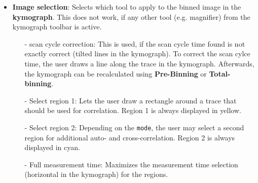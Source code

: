 \begin{itemize}
\item  \textbf{Image selection}: Selects which tool to apply to the binned image in the \textbf{kymograph}. This does not work, if any other tool (e.g. magnifier) from the kymograph toolbar is active.
	\begin{itemize}
	\item[-] scan cycle correction: This is used, if the scan cycle time found is not exactly correct (tilted lines in the kymograph). To correct the scan cylce time, the user draws a line along the trace in the kymograph. Afterwards, the kymograph can be recalculated using \textbf{Pre-Binning} or \textbf{Total-binning}.
	\item[-] Select region 1: Lets the user draw a rectangle around a trace that should be used for correlation. Region 1 is always displayed in yellow.
	\item[-] Select region 2: Depending on the \texttt{mode}, the user may select a second region for additional auto- and cross-correlation. Region 2 is always displayed in cyan.
	\item[-] Full measurement time: Maximizes the measurement time selection (horizontal in the kymograph) for the regions.
	\end{itemize}
	

\end{itemize}
